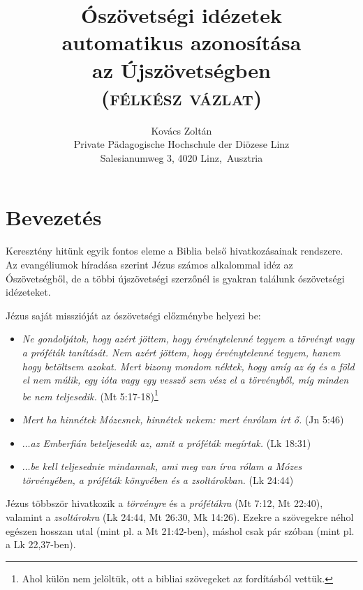 \documentclass{article}
\newcommand\hu{\selectlanguage{magyar}\frenchspacing}
\newcommand\de{\selectlanguage{german}\frenchspacing}
\begin{document}
\hu
\title{Ószövetségi idézetek \\automatikus azonosítása\\ az Újszövetségben\\
\textsc{(félkész vázlat)}}
\author{Kovács Zoltán\\ \de Private Pädagogische Hochschule der Diözese Linz\\
Salesianumweg 3, 4020 Linz,\hu\ Ausztria}
\maketitle

\section{Bevezetés}
Keresztény hitünk egyik fontos eleme a Biblia belső hivatkozásainak rendszere.
Az evangéliumok híradása szerint Jézus számos alkalommal idéz az Ószövetségből, de
a többi újszövetségi szerzőnél is gyakran találunk ószövetségi idézeteket.

Jézus saját misszióját az ószövetségi előzménybe helyezi be:
\begin{itemize}
\item \textit{Ne gondoljátok, hogy azért jöttem, hogy érvénytelenné tegyem a törvényt
vagy a próféták tanítását. Nem azért jöttem, hogy érvénytelenné tegyem, hanem hogy betöltsem azokat.
Mert bizony mondom néktek, hogy amíg az ég és a föld el nem múlik, egy ióta vagy egy vessző
sem vész el a törvényből, míg minden be nem teljesedik.} (Mt 5:17-18)\footnote{Ahol külön
nem jelöltük, ott a bibliai szövegeket az \cite{UFO} fordításból vettük.}
\item \textit{Mert ha hinnétek Mózesnek, hinnétek nekem: mert énrólam írt ő.} (Jn 5:46)
\item \textit{$\ldots$az Emberfián beteljesedik az, amit a próféták megírtak.} (Lk 18:31)
\item \textit{$\ldots$be kell teljesednie mindannak, ami meg van írva rólam a Mózes törvényében,
a próféták könyvében és a zsoltárokban.} (Lk 24:44)
\end{itemize}
Jézus többször hivatkozik a \textit{törvényre} és a \textit{prófétákra} (Mt 7:12, Mt 22:40), valamint
a \textit{zsoltárokra} (Lk 24:44, Mt 26:30, Mk 14:26). Ezekre a szövegekre néhol egészen hosszan utal
(mint pl. a Mt 21:42-ben), máshol csak pár szóban (mint pl. a Lk 22,37-ben).
\end{document}
